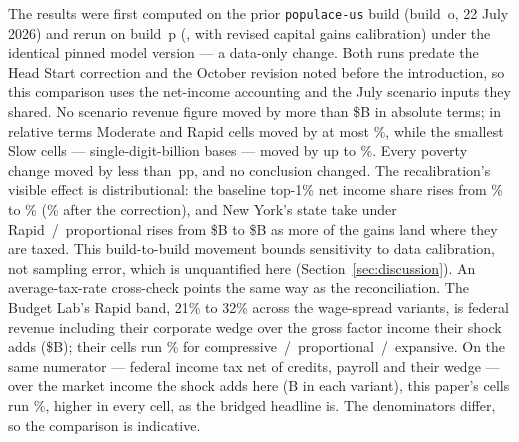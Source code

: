 The results were first computed on the prior \texttt{populace-us} build
(build~o, 22 July 2026) and rerun on build~p (\genDataBuildDate{}, with
revised capital gains calibration) under the identical pinned model version
--- a data-only change. Both runs predate the Head Start correction and the
October revision noted before the introduction, so this comparison uses the
net-income accounting and the July scenario inputs they shared. No scenario revenue figure moved by more than
\$\genStabMaxAbsRevB B in absolute terms; in relative terms Moderate and
Rapid cells moved by at most \genStabMaxRelModRapidPct\%, while the smallest
Slow cells --- single-digit-billion bases --- moved by up to
\genStabMaxRelPct\%. Every poverty change moved by less than
\genStabMaxPovChangePp\,pp, and no conclusion changed. The recalibration's
visible effect is distributional: the baseline top-1\% net income share
rises from \genStabTopOneOld\% to \genStabTopOneNew\% (\genBaselineTopOnePct\%
after the correction), and New York's state
take under Rapid~/~proportional rises from \$\genStabNYOld B to \$\genStabNYNew B as more
of the gains land where they are taxed. This build-to-build movement bounds
sensitivity to data calibration, not sampling error, which is unquantified
here (Section~\ref{sec:discussion}). An average-tax-rate cross-check points
the same way as the reconciliation. The Budget Lab's Rapid band, 21\% to
32\% across the wage-spread variants, is federal revenue including their
corporate wedge over the gross factor income their shock adds
(\$\genTheirRapidGrossIncomeB B); their cells run \genAtrTheirsTriplet\%
for compressive~/~proportional~/~expansive. On the same numerator ---
federal income tax net of credits, payroll and their wedge --- over the
market income the shock adds here (\genRapidPropMarketDelta B in each
variant), this paper's cells run \genAtrOursMatchedTriplet\%, higher in
every cell, as the bridged headline is. The denominators differ, so the
comparison is indicative.
